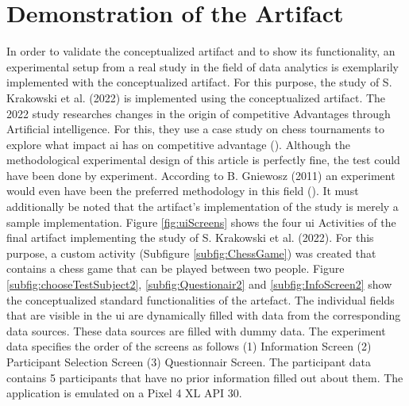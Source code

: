 \newpage\section{Demonstration of the Artifact}

In order to validate the conceptualized artifact and to show its functionality, an experimental setup from a real study in the field of data analytics is exemplarily implemented with the conceptualized artifact. For this purpose, the study of S. Krakowski et al. (2022) is implemented using the conceptualized artifact. The 2022 study researches changes in the origin of competitive Advantages through Artificial intelligence. For this, they use a case study on chess tournaments to explore what impact \ac{ai} has on competitive advantage (\cite{Krakowski.2022}). Although the methodological experimental design of this article is perfectly fine, the test could have been done by experiment. According to B. Gniewosz (2011) an experiment would even have been the preferred methodology in this field (\cite{Gniewosz.2011}).%
It must additionally be noted that the artifact's implementation of the study is merely a sample implementation.
Figure \ref{fig:uiScreens} shows the four \ac{ui} Activities of the final artifact implementing the study of S. Krakowski et al. (2022). For this purpose, a custom activity (Subfigure \ref{subfig:ChessGame}) was created that contains a chess game that can be played between two people. Figure \ref{subfig:chooseTestSubject2}, \ref{subfig:Questionair2} and \ref{subfig:InfoScreen2} show the conceptualized standard functionalities of the artefact. The individual fields that are visible in the \ac{ui} are dynamically filled with data from the corresponding data sources. These data sources are filled with dummy data. The experiment data specifies the order of the screens as follows (1) Information Screen (2) Participant Selection Screen (3) Questionnair Screen. The participant data contains 5 participants that have no prior information filled out about them. The application is emulated on a Pixel 4 XL API 30.

